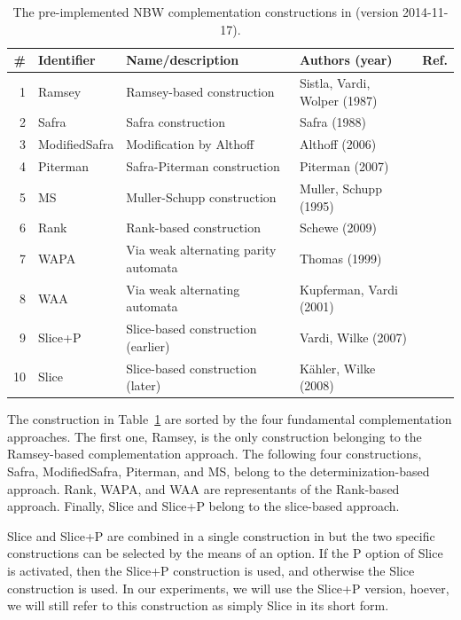 \begin{table}[htb!]
\centering
\begin{tabular}{rlllr}
\hline
\# & Identifier & Name/description & Authors (year) & Ref. \\
\hline
1 & Ramsey & Ramsey-based construction & Sistla, Vardi, Wolper (1987) & \cite{PrasadSistla1987217} \\
2 & Safra & Safra construction & Safra (1988) & \cite{1988_safra_1} \\
3 & ModifiedSafra & Modification by Althoff & Althoff (2006) & \cite{2006_althoff} \\
4 & Piterman & Safra-Piterman construction & Piterman (2007) & \cite{2007_piterman} \\
5 & MS & Muller-Schupp construction & Muller, Schupp (1995) & \cite{Muller199569} \\
6 & Rank & Rank-based construction & Schewe (2009) & \cite{schewe2009buchi} \\
7 & WAPA & Via weak alternating parity automata & Thomas (1999) & \cite{1999_thomas} \\
8 & WAA & Via weak alternating automata & Kupferman, Vardi (2001) & \cite{Kupferman:2001} \\
9 & Slice+P & Slice-based construction (earlier) & Vardi, Wilke (2007) & \cite{vardi2007automata} \\
10 & Slice & Slice-based construction (later) & Kähler, Wilke (2008) & \cite{2008_kaehler} \\
\hline
\end{tabular}
\caption{The pre-implemented NBW complementation constructions in \goal{} (version 2014-11-17).}
\label{goal_constructions}
\end{table}

The construction in Table~\ref{goal_constructions} are sorted by the four fundamental complementation approaches. The first one, Ramsey, is the only construction belonging to the Ramsey-based complementation approach. The following four constructions, Safra, ModifiedSafra, Piterman, and MS, belong to the determinization-based approach. Rank, WAPA, and WAA are representants of the Rank-based approach. Finally, Slice and Slice+P belong to the slice-based approach.

Slice and Slice+P are combined in a single construction in \goal{} but the two specific constructions can be selected by the means of an option. If the P option of Slice is activated, then the Slice+P construction is used, and otherwise the Slice construction is used. In our experiments, we will use the Slice+P version, hoever, we will still refer to this construction as simply Slice in its short form.

